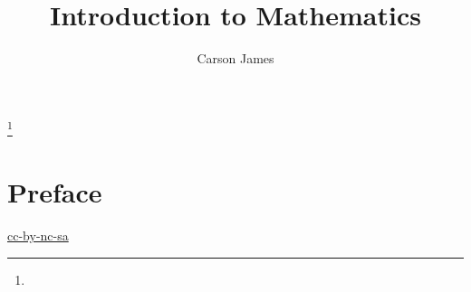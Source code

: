 \documentclass{book}
\begin{document}
	
	\frontmatter
	
	\title{Introduction to Mathematics}
	
	
	\author{Carson James}
	\thanks{}
	
	\date{}
	
	\maketitle
	
	
	\setcounter{page}{4}
	
	\tableofcontents
	\printunsrtglossary[type=symbols,style=long,title={Notation}]
	
	
	\mainmatter
	
	\chapter*{Preface}
	
	\begin{flushleft}
		\href{https://creativecommons.org/licenses/by-nc-sa/4.0/legalcode.txt}{cc-by-nc-sa}
	\end{flushleft}
	
	\newpage
	
	
	
	
	
	
	
	
	
	
	
	
	
	
	
	
	
	
	
	
	
	
	
\end{document}

